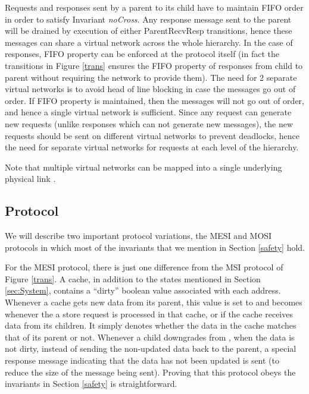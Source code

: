Requests and responses sent by a parent to its child have to maintain FIFO
order in order to satisfy Invariant \textit{noCross}. Any response message sent
to the parent will be drained by execution of either ParentRecvResp
transitions, hence these messages can share a virtual network across the whole
hierarchy. In the case of responses, FIFO property can be enforced at the
protocol itself (in fact the transitions in Figure \ref{trans} ensures the FIFO
property of responses from child to parent without requiring the network to
provide them). The need for 2 separate virtual networks is to avoid head of
line blocking in case the messages go out of order. If FIFO property is
maintained, then the messages will not go out of order, and hence a single
virtual network is sufficient.  Since any request can generate new requests
(unlike responses which can not generate new messages), the new requests should
be sent on different virtual networks to prevent deadlocks, hence the need for
separate virtual networks for requests at each level of the hierarchy.

Note that multiple virtual networks can be mapped into a single underlying
physical link \cite{noc-funda}.


\subsection{Protocol}
We will describe two important protocol variations, the MESI and MOSI protocols
in which most of the invariants that we mention in Section \ref{safety} hold.

For the MESI protocol, there is just one difference from the MSI protocol of
Figure \ref{trans}. A cache, in addition to the states mentioned in Section
\ref{sec:System}, contains a ``dirty'' boolean value associated with each
address.  Whenever a cache gets new data from its parent, this value is set to
\False{} and becomes \True{} whenever the a store request is processed in that
cache, or if the cache receives data from its children. It simply denotes
whether the data in the cache matches that of its parent or not.  Whenever a
child downgrades from \Mo{}, when the data is not dirty, instead of sending the
non-updated data back to the parent, a special response message indicating that
the data has not been updated is sent (to reduce the size of the message being
sent). Proving that this protocol obeys the invariants in Section \ref{safety}
is straightforward.

